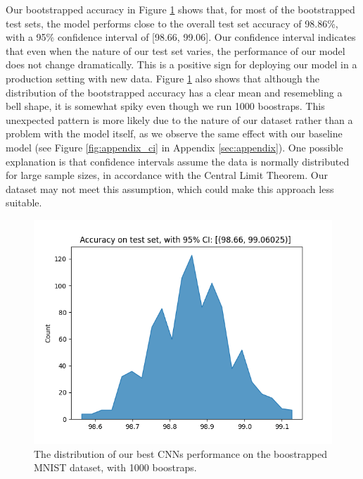 \newpage
Our bootstrapped accuracy in Figure \ref{fig:cnn_conf} shows that, for most of the bootstrapped test sets, the model performs close to the overall test set accuracy of 98.86\%, with a 95\% confidence interval of [98.66, 99.06]. Our confidence interval indicates that even when the nature of our test set varies, the performance of our model does not change dramatically. This is a positive sign for deploying our model in a production setting with new data. Figure \ref{fig:cnn_conf} also shows that although the distribution of the bootstrapped accuracy has a clear mean and resemebling a bell shape, it is somewhat spiky even though we run 1000 boostraps. This unexpected pattern is more likely due to the nature of our dataset rather than a problem with the model itself, as we observe the same effect with our baseline model (see Figure \ref{fig:appendix_ci} in Appendix \ref{sec:appendix}). One possible explanation is that confidence intervals assume the data is normally distributed for large sample sizes, in accordance with the Central Limit Theorem. Our dataset may not meet this assumption, which could make this approach less suitable.
\newline
\newline

\begin{figure}[H]
    \centering
    \includegraphics[width=\linewidth]{results/evaluation/cnn_confidence.png}
    \caption{The distribution of our best CNNs performance on the boostrapped MNIST dataset, with 1000 boostraps.}
    \label{fig:cnn_conf}
\end{figure}

